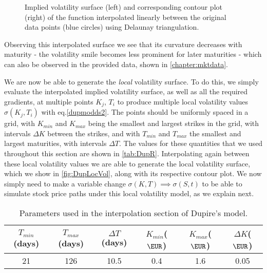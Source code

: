 \begin{figure}[H]
  \begin{subfigmatrix}{2}
  \end{subfigmatrix}
    \caption[Implied volatility surface and corresponding contour plot of the function interpolated linearly between the original data points using Delaunay triangulation.]{Implied volatility surface (left) and corresponding contour plot (right) of the function interpolated linearly between the original data points (blue circles) using Delaunay triangulation.}\label{fig:DupImpV}
\end{figure}   


Observing this interpolated surface we see that its curvature decreases with maturity - the volatility smile becomes less prominent for later maturities - which can also be observed in the provided data, shown in \autoref{chapter:mktdata}.


We are now be able to generate the \emph{local} volatility surface. To do this, we simply evaluate the interpolated implied volatility surface, as well as all the required gradients, at multiple points $K_j$, $T_i$ to produce multiple local volatility values $\sigma(K_j,T_i)$ with eq.\eqref{dupmodds2}. The points should be uniformly spaced in a grid, with $K_{min}$ and $K_{max}$ being the smallest and largest strikes in the grid, with intervals $\Delta K$ between the strikes, and with $T_{min}$ and $T_{max}$ the smallest and largest maturities, with intervals $\Delta T$. The values for these quantities that we used throughout this section are shown in \autoref{tab:DupR}.
Interpolating again between these local volatility values we are able to generate the local volatility surface, which we show in \autoref{fig:DupLocVol}, along with its respective contour plot. We now simply need to make a variable change $\sigma(K,T)\implies \sigma(S,t)$ to be able to simulate stock price paths under this local volatility model, as we explain next.


\begin{table}[H]
    \centering
        \renewcommand{\arraystretch}{0.8}
\begin{tabular}{@{}cccccc@{}}
\toprule
$T_{min}$(days) & $T_{max}$(days) & $\Delta T$(days) & $K_{min}$($\EUR$) & $K_{max}$($\EUR$) & \multicolumn{1}{c}{$\Delta K$($\EUR$)}\\ \midrule
21 & 126 & 10.5 & 0.4 & 1.6 & \multicolumn{1}{c}{0.05} \\ \bottomrule
\end{tabular}
  \caption[Parameters used in the interpolation section of Dupire's model.]{Parameters used in the interpolation section of Dupire's model.}
  \label{tab:DupR}
\end{table}


